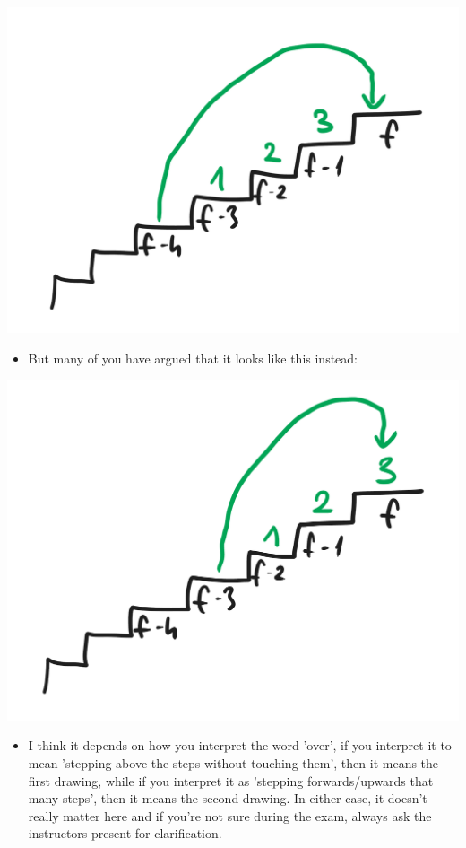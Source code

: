 \begin{center}
\includegraphics[width=0.7\linewidth]{10/06/ladder_step_over_3.png}
\end{center}

\begin{itemize}
    \item But many of you have argued that it looks like this instead:
\end{itemize}

\begin{center}
\includegraphics[width=0.7\linewidth]{10/06/ladder_steps_other.png}
\end{center}

\begin{itemize}
    \item I think it depends on how you interpret the word 'over', if you interpret it to mean 'stepping above the steps without touching them', then it means the first drawing, while if you interpret it as 'stepping forwards/upwards that many steps', then it means the second drawing. In either case, it doesn't really matter here and if you're not sure during the exam, always ask the instructors present for clarification.
\end{itemize}

